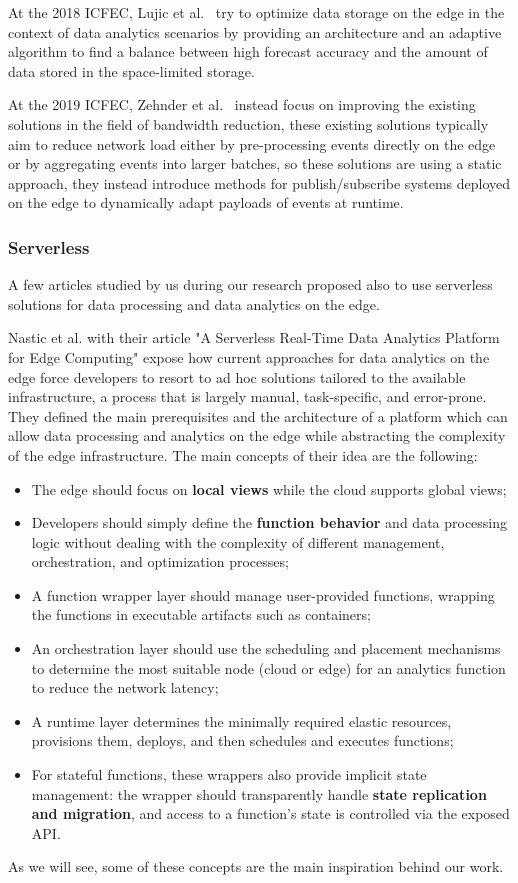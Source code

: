At the 2018 ICFEC, Lujic et al.~\cite{efficient-edge-storage} try to optimize data storage on the edge in the context of data analytics scenarios by providing an architecture and an adaptive algorithm to find a balance between high forecast accuracy and the amount of data stored in the space-limited storage.

At the 2019 ICFEC, Zehnder et al.~\cite{virtual-events-edge} instead focus on improving the existing solutions in the field of bandwidth reduction, these existing solutions typically aim to reduce network load either by pre-processing events directly on the edge or by aggregating events into larger batches, so these solutions are using a static approach, they instead introduce methods for publish/subscribe systems deployed on the edge to dynamically adapt payloads of events at runtime.


\subsubsection{Serverless}
A few articles studied by us during our research proposed also to use serverless solutions for data processing and data analytics on the edge.

Nastic et al. with their article "A Serverless Real-Time Data Analytics Platform for Edge Computing" \cite{serverless-analytics-edge} expose how current approaches for data analytics on the edge force developers to resort to ad hoc solutions tailored to the available infrastructure, a process that is largely manual, task-specific, and error-prone. They defined the main prerequisites and the architecture of a platform which can allow data processing and analytics on the edge while abstracting the complexity of the edge infrastructure. The main concepts of their idea are the following:
\begin{itemize}
    \item The edge should focus on \textbf{local views} while the cloud supports global views;
    \item Developers should simply define the \textbf{function behavior} and data processing logic without dealing with the complexity of different management, orchestration, and optimization processes;
    \item A function wrapper layer should manage user-provided functions, wrapping the functions in executable artifacts such as containers;
    \item An orchestration layer should use the scheduling and placement mechanisms to determine the most suitable node (cloud or edge) for an analytics function to reduce the network latency;
    \item A runtime layer determines the minimally required elastic resources, provisions them, deploys, and then schedules and executes functions;
    \item For stateful functions, these wrappers also provide implicit state management: the wrapper should transparently handle \textbf{state replication and migration}, and access to a function’s state is controlled via the exposed API.
\end{itemize}
As we will see, some of these concepts are the main inspiration behind our work.

